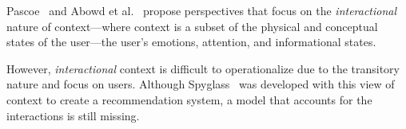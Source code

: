Pascoe~\citep{Pascoe:1998} and Abowd et al.~\cite{Abowd:1999} propose perspectives that focus on the \textit{interactional} nature of context---where context is a subset of the physical and conceptual states of the user---the user's emotions, attention, and informational states.


However, \textit{interactional} context is difficult to operationalize due to the transitory nature and focus on users. Although Spyglass~\cite{Viriyakattiyaporn:2010} was developed with this view of context to create a recommendation system, a model that accounts for the interactions is still missing.


